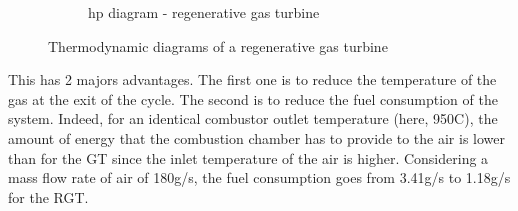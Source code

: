 \begin{figure}[h]
\begin{subfigure}[b]{0.4\textwidth}
         \caption{hp diagram - regenerative gas turbine}
         \label{fig:C4_hp_RGT}
     \end{subfigure}
        \caption{Thermodynamic diagrams of a regenerative gas turbine}
        \label{fig:C4_thermo_diagram_GT}
\end{figure}

This has 2 majors advantages. The first one is to reduce the temperature of the gas at the exit of the cycle. The second is to reduce the fuel consumption of the system. Indeed, for an identical combustor outlet temperature (here, 950\degree C), the amount of energy that the combustion chamber has to provide to the air is lower than for the GT since the inlet temperature of the air is higher. Considering a mass flow rate of air of 180g/s, the fuel consumption goes from 3.41g/s to 1.18g/s for the RGT.

